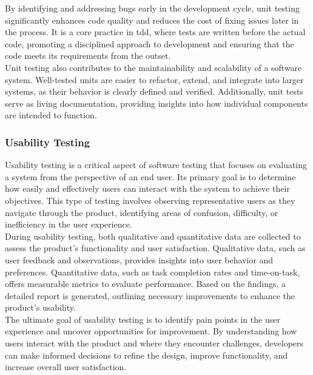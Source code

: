 By identifying and addressing bugs early in the development cycle, unit testing significantly enhances code quality and reduces the cost of fixing issues later in the process. It is a core practice in \gls{tdd}, where tests are written before the actual code, promoting a disciplined approach to development and ensuring that the code meets its requirements from the outset. \cite{geeksforgeeks:unit-test} \\

Unit testing also contributes to the maintainability and scalability of a software system. Well-tested units are easier to refactor, extend, and integrate into larger systems, as their behavior is clearly defined and verified. Additionally, unit tests serve as living documentation, providing insights into how individual components are intended to function.

\subsubsection*{Usability Testing}
\label{subsubsec:usability-testing}

Usability testing is a critical aspect of software testing that focuses on evaluating a system from the perspective of an end user. Its primary goal is to determine how easily and effectively users can interact with the system to achieve their objectives. This type of testing involves observing representative users as they navigate through the product, identifying areas of confusion, difficulty, or inefficiency in the user experience. \cite{geeksforgeeks:user-test} \\

During usability testing, both qualitative and quantitative data are collected to assess the product's functionality and user satisfaction. Qualitative data, such as user feedback and observations, provides insights into user behavior and preferences. Quantitative data, such as task completion rates and time-on-task, offers measurable metrics to evaluate performance. Based on the findings, a detailed report is generated, outlining necessary improvements to enhance the product's usability. \cite{geeksforgeeks:user-test} \\

The ultimate goal of usability testing is to identify pain points in the user experience and uncover opportunities for improvement. By understanding how users interact with the product and where they encounter challenges, developers can make informed decisions to refine the design, improve functionality, and increase overall user satisfaction. \cite{geeksforgeeks:user-test}

